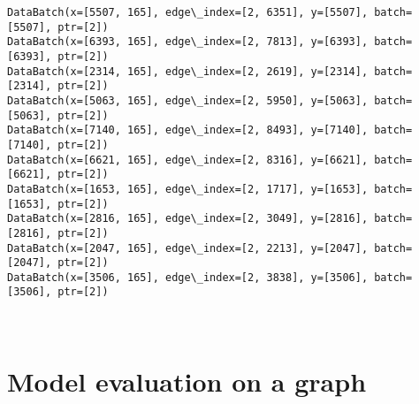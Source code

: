 \documentclass[11pt]{article}
\begin{document}
    \begin{Verbatim}[commandchars=\\\{\}]
DataBatch(x=[5507, 165], edge\_index=[2, 6351], y=[5507], batch=[5507], ptr=[2])
DataBatch(x=[6393, 165], edge\_index=[2, 7813], y=[6393], batch=[6393], ptr=[2])
DataBatch(x=[2314, 165], edge\_index=[2, 2619], y=[2314], batch=[2314], ptr=[2])
DataBatch(x=[5063, 165], edge\_index=[2, 5950], y=[5063], batch=[5063], ptr=[2])
DataBatch(x=[7140, 165], edge\_index=[2, 8493], y=[7140], batch=[7140], ptr=[2])
DataBatch(x=[6621, 165], edge\_index=[2, 8316], y=[6621], batch=[6621], ptr=[2])
DataBatch(x=[1653, 165], edge\_index=[2, 1717], y=[1653], batch=[1653], ptr=[2])
DataBatch(x=[2816, 165], edge\_index=[2, 3049], y=[2816], batch=[2816], ptr=[2])
DataBatch(x=[2047, 165], edge\_index=[2, 2213], y=[2047], batch=[2047], ptr=[2])
DataBatch(x=[3506, 165], edge\_index=[2, 3838], y=[3506], batch=[3506], ptr=[2])
    \end{Verbatim}

    \begin{center}
    \end{center}
    { \hspace*{\fill} \\}
    
    \hypertarget{model-evaluation-on-a-graph}{%
\section{Model evaluation on a
graph}\label{model-evaluation-on-a-graph}}
\end{document}
